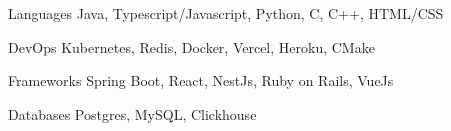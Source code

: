 

\begin{cvskills}

  \cvskill
  {Languages}
  {Java, Typescript/Javascript, Python, C, C++, HTML/CSS}

  \cvskill
  {DevOps}
  {Kubernetes, Redis, Docker, Vercel, Heroku, CMake}

  \cvskill
  {Frameworks}
  {Spring Boot, React, NestJs, Ruby on Rails, VueJs}

  \cvskill
  {Databases}
  {Postgres, MySQL, Clickhouse}

\end{cvskills}
